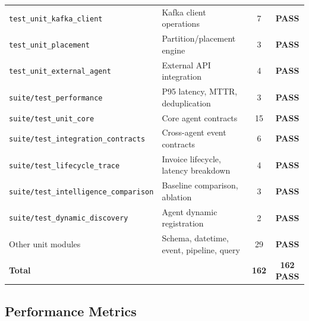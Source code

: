 ﻿\documentclass[runningheads]{llncs}
\begin{document}
\begin{table}[H]
{\begin{tabular}{llcc}
\texttt{test\_unit\_kafka\_client} & Kafka client operations & 7 & \textbf{PASS} \\
\texttt{test\_unit\_placement} & Partition/placement engine & 3 & \textbf{PASS} \\
\texttt{test\_unit\_external\_agent} & External API integration & 4 & \textbf{PASS} \\
\texttt{suite/test\_performance} & P95 latency, MTTR, deduplication & 3 & \textbf{PASS} \\
\texttt{suite/test\_unit\_core} & Core agent contracts & 15 & \textbf{PASS} \\
\texttt{suite/test\_integration\_contracts} & Cross-agent event contracts & 6 & \textbf{PASS} \\
\texttt{suite/test\_lifecycle\_trace} & Invoice lifecycle, latency breakdown & 4 & \textbf{PASS} \\
\texttt{suite/test\_intelligence\_comparison} & Baseline comparison, ablation & 3 & \textbf{PASS} \\
\texttt{suite/test\_dynamic\_discovery} & Agent dynamic registration & 2 & \textbf{PASS} \\
Other unit modules & Schema, datetime, event, pipeline, query & 29 & \textbf{PASS} \\
\midrule
\textbf{Total} & & \textbf{162} & \textbf{162 PASS} \\
\bottomrule
\end{tabular}
}
\end{table}

\subsection{Performance Metrics}
\end{document}
